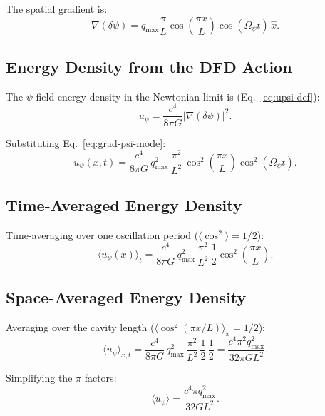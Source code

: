\documentclass[aps,prd,twocolumn,showpacs,preprintnumbers,superscriptaddress,nofootinbib]{revtex4-2}
\newcommand{\Opsi}{\Omega_\psi}
\begin{document}
The spatial gradient is:
\begin{equation}\label{eq:grad-psi-mode}
\nabla(\delta\psi) = q_{\max}\frac{\pi}{L}
  \cos\!\left(\frac{\pi x}{L}\right)\cos(\Opsi t)\,\hat{x}.
\end{equation}

\subsection{Energy Density from the DFD Action}\label{sec:energy-from-action}

The $\psi$-field energy density in the Newtonian limit is
(Eq.~\ref{eq:upsi-def}):
\begin{equation}
u_\psi = \frac{c^4}{8\pi G}|\nabla(\delta\psi)|^2.
\end{equation}

Substituting Eq.~\eqref{eq:grad-psi-mode}:
\begin{equation}
u_\psi(x,t) = \frac{c^4}{8\pi G}\,q_{\max}^2\,\frac{\pi^2}{L^2}\,
  \cos^2\!\left(\frac{\pi x}{L}\right)\cos^2(\Opsi t).
\end{equation}

\subsection{Time-Averaged Energy Density}\label{sec:time-avg}

Time-averaging over one oscillation period ($\langle\cos^2\rangle = 1/2$):
\begin{equation}
\langle u_\psi(x)\rangle_t = \frac{c^4}{8\pi G}\,q_{\max}^2\,
  \frac{\pi^2}{L^2}\,\frac{1}{2}\cos^2\!\left(\frac{\pi x}{L}\right).
\end{equation}

\subsection{Space-Averaged Energy Density}\label{sec:space-avg}

Averaging over the cavity length
($\langle\cos^2(\pi x/L)\rangle_x = 1/2$):
\begin{equation}\label{eq:u-avg}
\langle u_\psi\rangle_{x,t} = \frac{c^4}{8\pi G}\,q_{\max}^2\,
  \frac{\pi^2}{L^2}\,\frac{1}{2}\,\frac{1}{2}
  = \frac{c^4\pi^2 q_{\max}^2}{32\pi G L^2}.
\end{equation}

Simplifying the $\pi$ factors:
\begin{equation}\label{eq:u-avg-simplified}
\boxed{\langle u_\psi\rangle = \frac{c^4\pi q_{\max}^2}{32 G L^2}.}
\end{equation}
\end{document}
